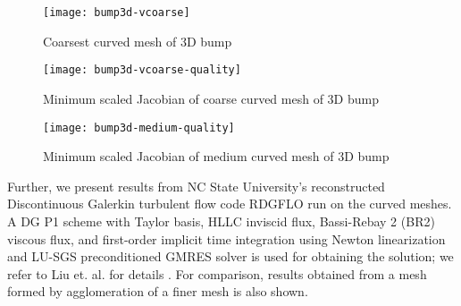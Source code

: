 \begin{figure}
 \centering
 \texttt{[image: bump3d-vcoarse]}
 \caption{Coarsest curved mesh of 3D bump}
 \label{fig:bump3d}
\end{figure}

\begin{figure}
	\centering
	\texttt{[image: bump3d-vcoarse-quality]}
	\caption{Minimum scaled Jacobian of coarse curved mesh of 3D bump}
	\label{fig:bump3d-coarse-jac}
\end{figure}
\begin{figure}
	\centering
	\texttt{[image: bump3d-medium-quality]}
	\caption{Minimum scaled Jacobian of medium curved mesh of 3D bump}
	\label{fig:bump3d-medium-jac}
\end{figure}

Further, we present results from NC State University's reconstructed Discontinuous Galerkin turbulent flow code RDGFLO run on the curved meshes. A DG P1 scheme with Taylor basis, HLLC inviscid flux, Bassi-Rebay 2 (BR2) viscous flux, and first-order implicit time integration using Newton linearization and LU-SGS preconditioned GMRES solver is used for obtaining the solution; we refer to Liu et. al. for details \cite{solver}. For comparison, results obtained from a mesh formed by agglomeration of a finer mesh is also shown.